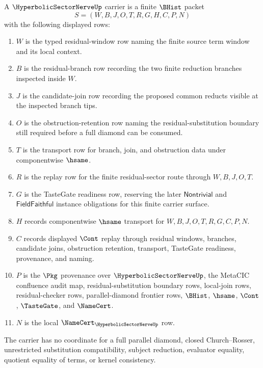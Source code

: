 \begin{definition}
\label{def:hyperbolic-sector-nerve-carrier}
A $\HyperbolicSectorNerveUp$ carrier is a finite $\BHist$ packet
$$
S=(W,B,J,O,T,R,G,H,C,P,N)
$$
with the following displayed rows:
\begin{enumerate}
\item $W$ is the typed residual-window row naming the finite source term window and its local context.
\item $B$ is the residual-branch row recording the two finite reduction branches inspected inside $W$.
\item $J$ is the candidate-join row recording the proposed common reducts visible at the inspected branch tips.
\item $O$ is the obstruction-retention row naming the residual-substitution boundary still required before a full diamond can be consumed.
\item $T$ is the transport row for branch, join, and obstruction data under componentwise $\hsame$.
\item $R$ is the replay row for the finite residual-sector route through $W,B,J,O,T$.
\item $G$ is the TasteGate readiness row, reserving the later $\mathsf{Nontrivial}$ and $\mathsf{FieldFaithful}$ instance obligations for this finite carrier surface.
\item $H$ records componentwise $\hsame$ transport for $W,B,J,O,T,R,G,C,P,N$.
\item $C$ records displayed $\Cont$ replay through residual windows, branches, candidate joins, obstruction retention, transport, TasteGate readiness, provenance, and naming.
\item $P$ is the $\Pkg$ provenance over $\HyperbolicSectorNerveUp$, the MetaCIC confluence audit map, residual-substitution boundary rows, local-join rows, residual-checker rows, parallel-diamond frontier rows, $\BHist$, $\hsame$, $\Cont$, $\TasteGate$, and $\NameCert$.
\item $N$ is the local $\NameCert_{\HyperbolicSectorNerveUp}$ row.
\end{enumerate}
The carrier has no coordinate for a full parallel diamond, closed Church--Rosser, unrestricted substitution compatibility, subject reduction, evaluator equality, quotient equality of terms, or kernel consistency.
\end{definition}

